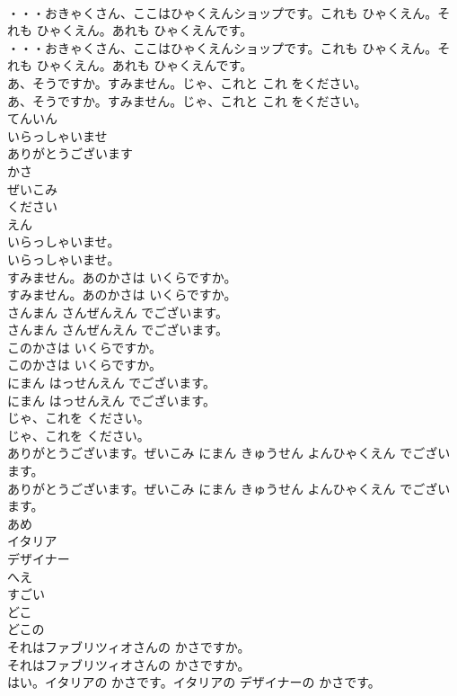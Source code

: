 \documentclass[8pt]{extreport}
\begin{document}
\begin{CJK}{UTF8}{min}
\\	・・・おきゃくさん、ここはひゃくえんショップです。これも ひゃくえん。それも ひゃくえん。あれも ひゃくえんです。	
\\	・・・おきゃくさん、ここはひゃくえんショップです。これも ひゃくえん。それも ひゃくえん。あれも ひゃくえんです。 
\\	あ、そうですか。すみません。じゃ、これと これ をください。	
\\	あ、そうですか。すみません。じゃ、これと これ をください。 
\\	てんいん
\\	いらっしゃいませ
\\	ありがとうございます
\\	かさ
\\	ぜいこみ
\\	ください
\\	えん
\\	いらっしゃいませ。	
\\	いらっしゃいませ。 
\\	すみません。あのかさは いくらですか。	
\\	すみません。あのかさは いくらですか。 
\\	さんまん さんぜんえん でございます。	
\\	さんまん さんぜんえん でございます。 
\\	このかさは いくらですか。	
\\	このかさは いくらですか。 
\\	にまん はっせんえん でございます。	
\\	にまん はっせんえん でございます。 
\\	じゃ、これを ください。	
\\	じゃ、これを ください。 
\\	ありがとうございます。ぜいこみ にまん きゅうせん よんひゃくえん でございます。	
\\	ありがとうございます。ぜいこみ にまん きゅうせん よんひゃくえん でございます。 
\\	あめ
\\	イタリア
\\	デザイナー
\\	へえ
\\	すごい
\\	どこ
\\	どこの
\\	それはファブリツィオさんの かさですか。	
\\	それはファブリツィオさんの かさですか。 
\\	はい。イタリアの かさです。イタリアの デザイナーの かさです。	

\end{CJK}
\end{document}
